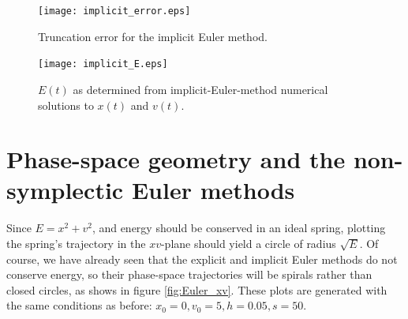 \documentclass{article}
\theoremstyle{definition}
\renewcommand{\>}{\rangle}
\newcommand{\<}{\langle}
\begin{document}
\begin{figure}
\texttt{[image: implicit\_error.eps]}
\caption{\label{fig:implicit_error}Truncation error for
the implicit Euler method.}
\end{figure}

\begin{figure}
\texttt{[image: implicit\_E.eps]}
\caption{\label{fig:implicit_E}$E(t)$ as determined from implicit-Euler-method numerical
solutions to $x(t)$ and $v(t)$.}
\end{figure}

\section{Phase-space geometry and the non-symplectic Euler methods}

Since $E=x^2 + v^2$, and energy should be conserved in an ideal spring,
plotting the spring's trajectory in the $xv$-plane should yield a circle of radius
$\sqrt{E}$. Of course, we have already seen that the explicit and implicit Euler
methods do not conserve energy, so their phase-space trajectories will be spirals
rather than closed circles, as shows in figure \ref{fig:Euler_xv}.
These plots are generated with the same conditions as before:
$x_0 = 0, v_0 = 5, h = 0.05, s = 50$.
\end{document}
